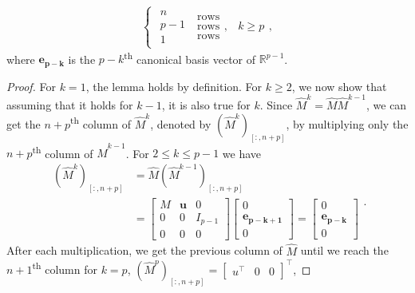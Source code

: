 \begin{lemma}
\begin{equation*}
\begin{cases}
            \begin{matrix} n \\ p-1 \\ 1 \end{matrix}
            \; \begin{matrix} \text{rows} \\ \text{rows} \\ \text{rows} \end{matrix},
            & k \ge p
        \end{cases},
    \end{equation*}
    where $\mathbf{e_{p-k}}$ is the $p-k$\textsuperscript{th} canonical basis vector of $\mathbb{R}^{p-1}$.
\end{lemma}
\begin{proof}
    For $k=1$, the lemma holds by definition. For $k \ge 2$, we now show that assuming
    that it holds for $k-1$, it is also true for $k$.
    Since $\hat{M}^k = \hat{M} \hat{M}^{k-1}$, we can get the $n+p$\textsuperscript{th}
    column of $\hat{M}^k$, denoted by $(\hat{M}^k)_{[:, n+p]}$, by multiplying only
    the $n+p$\textsuperscript{th} column of $\hat{M}^{k-1}$.
    For $2 \le k \le p-1$ we have
    \begin{equation*}
        \begin{aligned}
            (\hat{M}^k)_{[:, n+p]} & = \hat{M} (\hat{M}^{k-1})_{[:, n+p]} \\
            & =
            \begin{bmatrix} M & \mathbf{u} & 0\\ 0 & 0 & I_{p-1}\\ 0 & 0 & 0 \end{bmatrix}
            \begin{bmatrix} 0 \\ \mathbf{e_{p-k+1}} \\ 0 \end{bmatrix}
            =
            \begin{bmatrix} 0 \\ \mathbf{e_{p-k}} \\ 0 \end{bmatrix}
        \end{aligned}.
    \end{equation*}
    After each multiplication, we get the previous column of $\hat{M}$ until we reach
    the $n+1$\textsuperscript{th} column for $k=p$,
    $(\hat{M}^p)_{[:, n+p]} = \begin{bmatrix}u^\top & 0 & 0\end{bmatrix}^\top$,

\end{proof}
